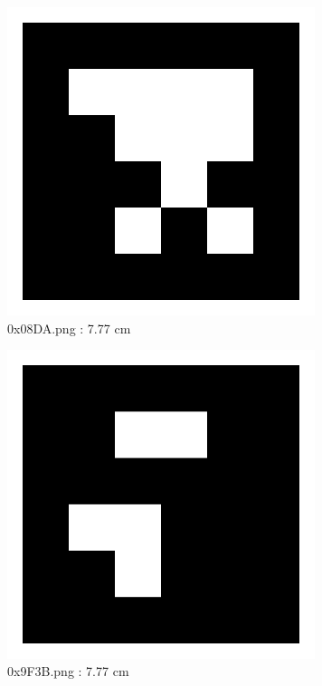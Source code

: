 \documentclass[11pt,a4,BCOR=0cm]{scrartcl}
\begin{document}
\begin{figure}
  \centering
    \includegraphics[natwidth=400,natheight=400,width=9cm]{0x08DA.png}
    \caption{0x08DA.png : 7.77 cm}
    \label{fig:0x08DA.png}
  
\end{figure} 

\clearpage

\begin{figure}
  \centering
    \includegraphics[natwidth=400,natheight=400,width=9cm]{0x9F3B.png}
    \caption{0x9F3B.png : 7.77 cm}
    \label{fig:0x9F3B.png}
  
\end{figure} 
\end{document}
